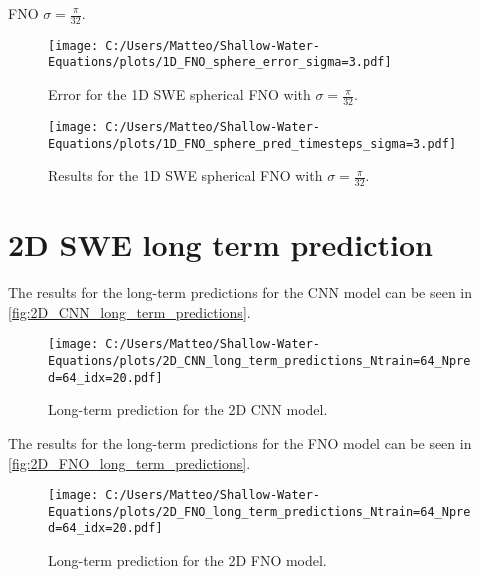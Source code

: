 FNO $\sigma = \frac{\pi}{32}$.
\begin{figure}[H]
    \centering
    \texttt{[image: C:/Users/Matteo/Shallow-Water-Equations/plots/1D\_FNO\_sphere\_error\_sigma=3.pdf]}
    \caption{Error for the 1D SWE spherical FNO with $\sigma = \frac{\pi}{32}$.}
\end{figure}

\begin{figure}[H]
    \centering
    \texttt{[image: C:/Users/Matteo/Shallow-Water-Equations/plots/1D\_FNO\_sphere\_pred\_timesteps\_sigma=3.pdf]}
    \caption{Results for the 1D SWE spherical FNO with $\sigma = \frac{\pi}{32}$.}
\end{figure}




\section{2D SWE long term prediction}\label{app:2D_SWE_long_term_prediction}
The results for the long-term predictions for the CNN model can be seen in \autoref{fig:2D_CNN_long_term_predictions}.
\begin{figure}[H]
    \centering
    \texttt{[image: C:/Users/Matteo/Shallow-Water-Equations/plots/2D\_CNN\_long\_term\_predictions\_Ntrain=64\_Npred=64\_idx=20.pdf]}
    \caption{Long-term prediction for the 2D CNN model.}\label{fig:2D_CNN_long_term_predictions}
\end{figure}

The results for the long-term predictions for the FNO model can be seen in \autoref{fig:2D_FNO_long_term_predictions}.
\begin{figure}[H]
    \centering
    \texttt{[image: C:/Users/Matteo/Shallow-Water-Equations/plots/2D\_FNO\_long\_term\_predictions\_Ntrain=64\_Npred=64\_idx=20.pdf]}
    \caption{Long-term prediction for the 2D FNO model.}\label{fig:2D_FNO_long_term_predictions}
\end{figure}

